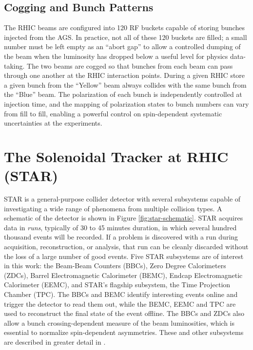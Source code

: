 \subsection{Cogging and Bunch Patterns}

The RHIC beams are configured into 120 RF buckets capable of storing bunches
injected from the AGS. In practice, not all of these 120 buckets are filled; a
small number must be left empty as an ``abort gap'' to allow a controlled
dumping of the beam when the luminosity has dropped below a useful level for
physics data-taking. The two beams are cogged so that bunches from each beam
can pass through one another at the RHIC interaction points. During a given
RHIC store a given bunch from the ``Yellow'' beam always collides with the
same bunch from the ``Blue'' beam. The polarization of each bunch is
independently controlled at injection time, and the mapping of polarization
states to bunch numbers can vary from fill to fill, enabling a powerful
control on spin-dependent systematic uncertainties at the experiments.

\section{The Solenoidal Tracker at RHIC (STAR)}

STAR \cite{Ackermann:2002ad} is a general-purpose collider detector with
several subsystems capable of investigating a wide range of phenomena from
multiple collision types. A schematic of the detector is shown in Figure
\ref{fig:star-schematic}. STAR acquires data in \textit{runs}, typically of 30
to 45 minutes duration, in which several hundred thousand events will be
recorded. If a problem is discovered with a run during acquisition,
reconstruction, or analysis, that run can be cleanly discarded without the
loss of a large number of good events. Five STAR subsystems are of interest in
this work: the Beam-Beam Counters (BBCs), Zero Degree Calorimeters (ZDCs),
Barrel Electromagnetic Calorimeter (BEMC), Endcap Electromagnetic Calorimeter
(EEMC), and STAR's flagship subsystem, the Time Projection Chamber (TPC). The
BBCs and BEMC identify interesting events online and trigger the detector to
read them out, while the BEMC, EEMC and TPC are used to reconstruct the final
state of the event offline. The BBCs and ZDCs also allow a bunch
crossing-dependent measure of the beam luminosities, which is essential to
normalize spin-dependent asymmetries. These and other subsystems are described
in greater detail in \cite{RHIC-Special-Issue}.


